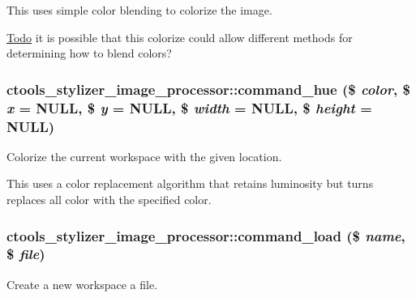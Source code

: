 This uses simple color blending to colorize the image.

\begin{Desc}
\item[\hyperlink{todo__todo000035}{Todo}]it is possible that this colorize could allow different methods for determining how to blend colors? \end{Desc}
\hypertarget{classctools__stylizer__image__processor_afd565f19f356b713eb24cd0248353ea2}{
\subsubsection[{command\_\-hue}]{\setlength{\rightskip}{0pt plus 5cm}ctools\_\-stylizer\_\-image\_\-processor::command\_\-hue (\$ {\em color}, \/  \$ {\em x} = {\ttfamily NULL}, \/  \$ {\em y} = {\ttfamily NULL}, \/  \$ {\em width} = {\ttfamily NULL}, \/  \$ {\em height} = {\ttfamily NULL})}}
\label{classctools__stylizer__image__processor_afd565f19f356b713eb24cd0248353ea2}
Colorize the current workspace with the given location.

This uses a color replacement algorithm that retains luminosity but turns replaces all color with the specified color. \hypertarget{classctools__stylizer__image__processor_ac609fbaeff7f515d601195936f7e57d2}{
\subsubsection[{command\_\-load}]{\setlength{\rightskip}{0pt plus 5cm}ctools\_\-stylizer\_\-image\_\-processor::command\_\-load (\$ {\em name}, \/  \$ {\em file})}}
\label{classctools__stylizer__image__processor_ac609fbaeff7f515d601195936f7e57d2}
Create a new workspace a file.

